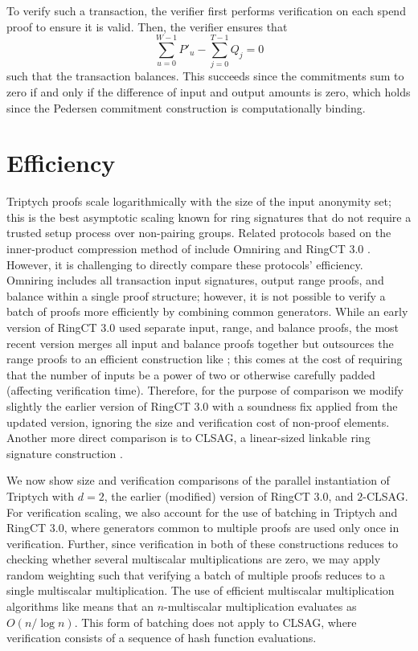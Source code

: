 \documentclass{article}
\theoremstyle{definition}
\begin{document}
To verify such a transaction, the verifier first performs verification on each spend proof to ensure it is valid.
Then, the verifier ensures that $$\sum_{u=0}^{W-1} P'_u - \sum_{j=0}^{T-1} Q_j = 0$$ such that the transaction balances.
This succeeds since the commitments sum to zero if and only if the difference of input and output amounts is zero, which holds since the Pedersen commitment construction is computationally binding.


\section{Efficiency}
Triptych proofs scale logarithmically with the size of the input anonymity set; this is the best asymptotic scaling known for ring signatures that do not require a trusted setup process over non-pairing groups.
Related protocols based on the inner-product compression method of \cite{bulletproofs} include Omniring \cite{omniring} and RingCT 3.0 \cite{omniring}.
However, it is challenging to directly compare these protocols' efficiency.
Omniring includes all transaction input signatures, output range proofs, and balance within a single proof structure; however, it is not possible to verify a batch of proofs more efficiently by combining common generators.
While an early version of RingCT 3.0 used separate input, range, and balance proofs, the most recent version merges all input and balance proofs together but outsources the range proofs to an efficient construction like \cite{bulletproofs}; this comes at the cost of requiring that the number of inputs be a power of two or otherwise carefully padded (affecting verification time).
Therefore, for the purpose of comparison we modify slightly the earlier version of RingCT 3.0 with a soundness fix applied from the updated version, ignoring the size and verification cost of non-proof elements.
Another more direct comparison is to CLSAG, a linear-sized linkable ring signature construction \cite{clsag}.

We now show size and verification comparisons of the parallel instantiation of Triptych with $d = 2$, the earlier (modified) version of RingCT 3.0, and $2$-CLSAG.
For verification scaling, we also account for the use of batching in Triptych and RingCT 3.0, where generators common to multiple proofs are used only once in verification.
Further, since verification in both of these constructions reduces to checking whether several multiscalar multiplications are zero, we may apply random weighting such that verifying a batch of multiple proofs reduces to a single multiscalar multiplication.
The use of efficient multiscalar multiplication algorithms like \cite{straus,pippenger} means that an $n$-multiscalar multiplication evaluates as $O(n/\log n)$.
This form of batching does not apply to CLSAG, where verification consists of a sequence of hash function evaluations.
\end{document}
